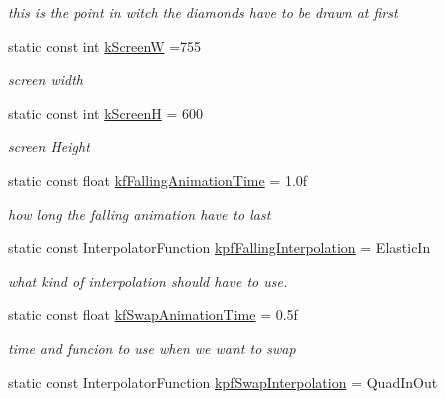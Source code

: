 \begin{DoxyCompactItemize}
\begin{DoxyCompactList}\small\item\em this is the point in witch the diamonds have to be drawn at first \end{DoxyCompactList}\item 
\hypertarget{class_game_logic_aec36c5794e269f0bbd979409d74194cc}{static const int \hyperlink{class_game_logic_aec36c5794e269f0bbd979409d74194cc}{k\-Screen\-W} =755}\label{class_game_logic_aec36c5794e269f0bbd979409d74194cc}

\begin{DoxyCompactList}\small\item\em screen width \end{DoxyCompactList}\item 
\hypertarget{class_game_logic_a74f7aab4dc99c914d72d14c35d0eb24f}{static const int \hyperlink{class_game_logic_a74f7aab4dc99c914d72d14c35d0eb24f}{k\-Screen\-H} = 600}\label{class_game_logic_a74f7aab4dc99c914d72d14c35d0eb24f}

\begin{DoxyCompactList}\small\item\em screen Height \end{DoxyCompactList}\item 
static const float \hyperlink{class_game_logic_ab012d83d151e25539f366c50f84a3f44}{kf\-Falling\-Animation\-Time} = 1.\-0f
\begin{DoxyCompactList}\small\item\em how long the falling animation have to last \end{DoxyCompactList}\item 
\hypertarget{class_game_logic_a25a4db48aca72c27a7e028521850f933}{static const Interpolator\-Function \hyperlink{class_game_logic_a25a4db48aca72c27a7e028521850f933}{kpf\-Falling\-Interpolation} = Elastic\-In}\label{class_game_logic_a25a4db48aca72c27a7e028521850f933}

\begin{DoxyCompactList}\small\item\em what kind of interpolation should have to use. \end{DoxyCompactList}\item 
\hypertarget{class_game_logic_a7cd0389af780922db8dc76b41bee5252}{static const float \hyperlink{class_game_logic_a7cd0389af780922db8dc76b41bee5252}{kf\-Swap\-Animation\-Time} = 0.\-5f}\label{class_game_logic_a7cd0389af780922db8dc76b41bee5252}

\begin{DoxyCompactList}\small\item\em time and funcion to use when we want to swap \end{DoxyCompactList}\item 
\hypertarget{class_game_logic_ab0790d9452ea70c3eb3f4f5ed9d2eec4}{static const Interpolator\-Function \hyperlink{class_game_logic_ab0790d9452ea70c3eb3f4f5ed9d2eec4}{kpf\-Swap\-Interpolation} = Quad\-In\-Out}\label{class_game_logic_ab0790d9452ea70c3eb3f4f5ed9d2eec4}


\end{DoxyCompactItemize}

